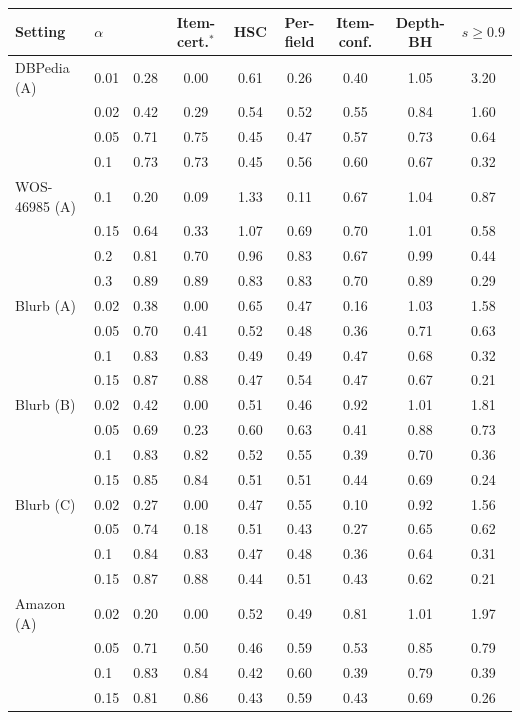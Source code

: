 \begin{tabular}{llccccccc}
\toprule
Setting & $\alpha$ & \hlcl{} & Item-cert.$^\ast$ & HSC & Per-field & Item-conf. & Depth-BH & $s\ge0.9$ \\
\midrule
DBPedia (A) & 0.01 & 0.28 & 0.00 & 0.61 & 0.26 & 0.40 & 1.05 & 3.20 \\
 & 0.02 & 0.42 & 0.29 & 0.54 & 0.52 & 0.55 & 0.84 & 1.60 \\
 & 0.05 & 0.71 & 0.75 & 0.45 & 0.47 & 0.57 & 0.73 & 0.64 \\
 & 0.1 & 0.73 & 0.73 & 0.45 & 0.56 & 0.60 & 0.67 & 0.32 \\
\addlinespace
WOS-46985 (A) & 0.1 & 0.20 & 0.09 & 1.33 & 0.11 & 0.67 & 1.04 & 0.87 \\
 & 0.15 & 0.64 & 0.33 & 1.07 & 0.69 & 0.70 & 1.01 & 0.58 \\
 & 0.2 & 0.81 & 0.70 & 0.96 & 0.83 & 0.67 & 0.99 & 0.44 \\
 & 0.3 & 0.89 & 0.89 & 0.83 & 0.83 & 0.70 & 0.89 & 0.29 \\
\addlinespace
Blurb (A) & 0.02 & 0.38 & 0.00 & 0.65 & 0.47 & 0.16 & 1.03 & 1.58 \\
 & 0.05 & 0.70 & 0.41 & 0.52 & 0.48 & 0.36 & 0.71 & 0.63 \\
 & 0.1 & 0.83 & 0.83 & 0.49 & 0.49 & 0.47 & 0.68 & 0.32 \\
 & 0.15 & 0.87 & 0.88 & 0.47 & 0.54 & 0.47 & 0.67 & 0.21 \\
\addlinespace
Blurb (B) & 0.02 & 0.42 & 0.00 & 0.51 & 0.46 & 0.92 & 1.01 & 1.81 \\
 & 0.05 & 0.69 & 0.23 & 0.60 & 0.63 & 0.41 & 0.88 & 0.73 \\
 & 0.1 & 0.83 & 0.82 & 0.52 & 0.55 & 0.39 & 0.70 & 0.36 \\
 & 0.15 & 0.85 & 0.84 & 0.51 & 0.51 & 0.44 & 0.69 & 0.24 \\
\addlinespace
Blurb (C) & 0.02 & 0.27 & 0.00 & 0.47 & 0.55 & 0.10 & 0.92 & 1.56 \\
 & 0.05 & 0.74 & 0.18 & 0.51 & 0.43 & 0.27 & 0.65 & 0.62 \\
 & 0.1 & 0.84 & 0.83 & 0.47 & 0.48 & 0.36 & 0.64 & 0.31 \\
 & 0.15 & 0.87 & 0.88 & 0.44 & 0.51 & 0.43 & 0.62 & 0.21 \\
\addlinespace
Amazon (A) & 0.02 & 0.20 & 0.00 & 0.52 & 0.49 & 0.81 & 1.01 & 1.97 \\
 & 0.05 & 0.71 & 0.50 & 0.46 & 0.59 & 0.53 & 0.85 & 0.79 \\
 & 0.1 & 0.83 & 0.84 & 0.42 & 0.60 & 0.39 & 0.79 & 0.39 \\
 & 0.15 & 0.81 & 0.86 & 0.43 & 0.59 & 0.43 & 0.69 & 0.26 \\
\bottomrule
\end{tabular}
